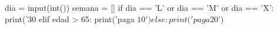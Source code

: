 \documentclass[preview]{standalone}
\begin{document}
\begin{center}
dia = input(int())
        semana = []
if dia == 'L' or dia == 'M' or dia == 'X':
   print('30 %
elif edad > 65:
   print('paga $10')
else:
   print('paga $20')
\end{center}
\end{document}
